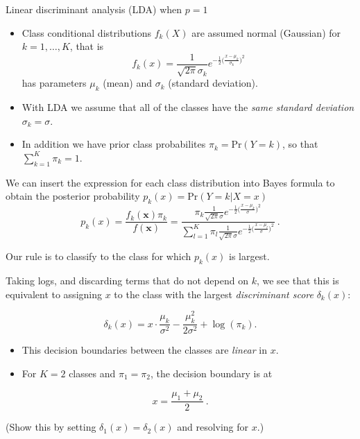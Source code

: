\documentclass[10pt,ignorenonframetext,]{beamer}
\begin{document}
\begin{frame}{Linear discriminant analysis (LDA) when \(p=1\)}
\protect\hypertarget{linear-discriminant-analysis-lda-when-p1}{}

\begin{itemize}
\item
  Class conditional distributions \(f_k(X)\) are assumed normal
  (Gaussian) for \(k=1,\ldots,K\), that is
  \[f_k(x) = \frac{1}{\sqrt{2\pi}\sigma_k} e^{-\frac{1}{2}\big(\frac{x-\mu_k}{\sigma_k}\big)^2} \]
  has parameters \(\mu_k\) (mean) and \(\sigma_k\) (standard deviation).
\item
  With LDA we assume that all of the classes have the \emph{same
  standard deviation} \(\sigma_k = \sigma\).
\item
  In addition we have prior class probabilites \(\pi_k=\text{Pr}(Y=k)\),
  so that \(\sum_{k=1}^K \pi_k=1\).
\end{itemize}

\end{frame}

\begin{frame}

We can insert the expression for each class distribution into Bayes
formula to obtain the posterior probability
\(p_k(x) = \text{Pr}(Y = k | X = x)\)
\[p_k(x) = \frac{f_k({\boldsymbol x}) \pi_k}{f({\boldsymbol x})}=\frac{\pi_k \frac{1}{\sqrt{2\pi}\sigma} e^{-\frac{1}{2}\big(\frac{x-\mu_k}{\sigma}\big)^2}}{\sum_{l=1}^K \pi_l \frac{1}{\sqrt{2\pi}\sigma} e^{-\frac{1}{2}\big(\frac{x-\mu_l}{\sigma}\big)^2}} \ .\]

Our rule is to classify to the class for which \(p_k(x)\) is largest.

\end{frame}

\begin{frame}

Taking logs, and discarding terms that do not depend on \(k\), we see
that this is equivalent to assigning \(x\) to the class with the largest
\emph{discriminant score} \(\delta_k(x)\):

\[\delta_k(x) = x\cdot \frac{\mu_k}{\sigma^2} - \frac{\mu_k^2}{2 \sigma^2}+\log(\pi_k).\]

\begin{itemize}
\item
  This decision boundaries between the classes are \emph{linear} in
  \(x\).
\item
  For \(K=2\) classes and \(\pi_1=\pi_2\), the decision boundary is at
\end{itemize}

\[x = \frac{\mu_1+ \mu_2}{2} \ .\]

(Show this by setting \(\delta_1(x)=\delta_2(x)\) and resolving for
\(x\).)

\end{frame}
\end{document}
